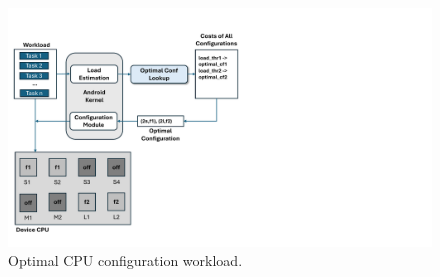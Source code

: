 \documentclass[conference]{IEEEtran}
\begin{document}
\begin{figure}[t]
\begin{center}
\includegraphics[scale=0.7]{ims/EuroPar2024Tool.pdf}
\end{center}
\caption{Optimal CPU configuration workload.}
\label{fig:workflow}
\end{figure}
\end{document}
